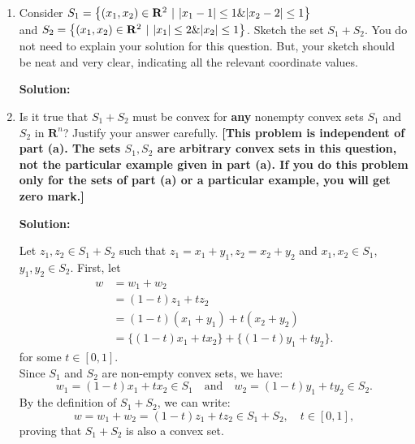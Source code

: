 \documentclass[11pt]{article}
\newenvironment{solution}
  {\par\noindent\textbf{Solution:}\par}
  {\par}
\begin{document}
\begin{enumerate}[start=3]
    \begin{enumerate}[label=(\alph*)]
      \item Consider $S_1 = \left\{ (x_1,x_2) \in \mathbf{R}^2 \hspace{.05in} \vert \hspace{.05in}
        \vert x_1 - 1\vert \le 1 \& \vert x_2 -2 \vert \le 1\right\}$ \\  
        and $ S_2 = \left\{ (x_1,x_2) \in \mathbf{R}^2 \hspace{.05in} \vert \hspace{.05in}
        \vert x_1\vert \le 2 \& \vert x_2 \vert \le 1\right\}$. Sketch the set $S_1 + S_2$. You do not need to explain 
        your solution for this question. But, your sketch should be neat and very clear, indicating all the 
        relevant coordinate values.
        \begin{solution}
        \end{solution}
      \item Is it true that $S_1 + S_2$ must be convex for \textbf{any} nonempty convex sets $S_1$ and $S_2$ in
        $\mathbf{R}^n$? Justify your answer carefully. \textbf{[This problem is independent of part (a). 
        The sets $S_1,S_2$ are arbitrary convex sets in this question, not the particular example given in part (a).
        If you do this problem only for the sets of part (a) or a particular example, you will get zero mark.]}
        \begin{solution}
          Let $z_1,z_2 \in S_1 + S_2$ such that $z_1 = x_1 + y_1,z_2 = x_2 + y_2$ and $x_1,x_2 \in S_1$, $y_1,y_2 \in S_2$.
          First, let 
          \begin{align*}
            w &= w_1 + w_2 \\
              &= (1-t)z_1 + tz_2 \\
              &= (1-t)(x_1 + y_1) + t(x_2 + y_2) \\
              &= \{(1-t)x_1 + tx_2\} + \{(1-t)y_1 + ty_2\}.
          \end{align*}
          for some $t \in [0,1]$. \\ 
          Since $S_1$ and $S_2$ are non-empty convex sets, we have:
          \[
          w_1 = (1-t)x_1 + tx_2 \in S_1 \quad \text{and} \quad w_2 = (1-t)y_1 + ty_2 \in S_2.
          \]
          By the definition of $S_1 + S_2$, we can write:
          \[
          w = w_1 + w_2 = (1-t)z_1 + tz_2 \in S_1 + S_2, \quad t \in [0,1],
          \]
          proving that $S_1 + S_2$ is also a convex set.
      \end{solution}
    \end{enumerate}
\end{enumerate}
\end{document}
